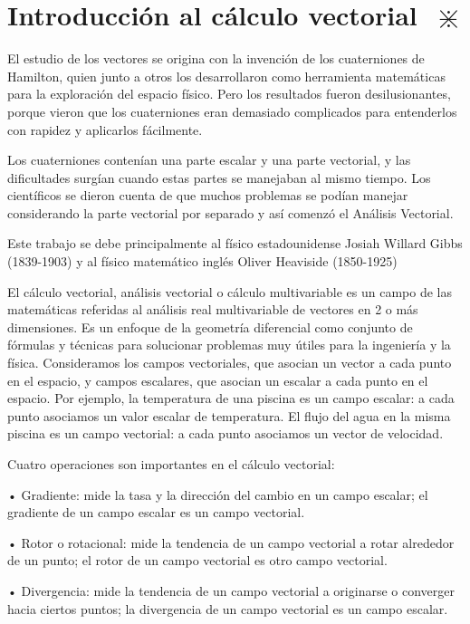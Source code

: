 \chapter{Introducción al cálculo vectorial $\; \divideontimes$}

\textcolor{gris}{ El estudio de los vectores se origina con la invención de los cuaterniones de Hamilton, quien junto a otros los desarrollaron como herramienta matemáticas para la exploración del espacio físico. Pero los resultados fueron desilusionantes, porque vieron que los cuaterniones eran demasiado complicados para entenderlos con rapidez y aplicarlos fácilmente.}

\textcolor{gris}{ Los cuaterniones contenían una parte escalar y una parte vectorial, y las dificultades surgían cuando estas partes se manejaban al mismo tiempo. Los científicos se dieron cuenta de que muchos problemas se podían manejar considerando la parte vectorial por separado y así comenzó el Análisis Vectorial.}

\textcolor{gris}{ Este trabajo se debe principalmente al físico estadounidense Josiah Willard Gibbs (1839-1903) y al físico matemático inglés Oliver Heaviside (1850-1925)}


\textcolor{gris}{ El cálculo vectorial, análisis vectorial o cálculo multivariable es un campo de las matemáticas referidas al análisis real multivariable de vectores en 2 o más dimensiones. Es un enfoque de la geometría diferencial como conjunto de fórmulas y técnicas para solucionar problemas muy útiles para la ingeniería y la física. Consideramos los campos vectoriales, que asocian un vector a cada punto en el espacio, y campos escalares, que asocian un escalar a cada punto en el espacio. Por ejemplo, la temperatura de una piscina es un campo escalar: a cada punto asociamos un valor escalar de temperatura. El flujo del agua en la misma piscina es un campo vectorial: a cada punto asociamos un vector de velocidad.} 

\textcolor{gris}{ Cuatro operaciones son importantes en el cálculo vectorial: }

\textcolor{gris}{ •	Gradiente: mide la tasa y la dirección del cambio en un campo escalar; el gradiente de un campo escalar es un campo vectorial.}

\textcolor{gris}{ •	Rotor o rotacional: mide la tendencia de un campo vectorial a rotar alrededor de un punto; el rotor de un campo vectorial es otro campo vectorial.}

\textcolor{gris}{ •	Divergencia: mide la tendencia de un campo vectorial a originarse o converger hacia ciertos puntos; la divergencia de un campo vectorial es un campo escalar.}

